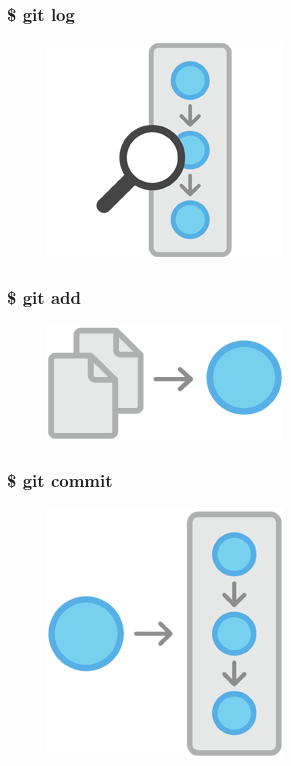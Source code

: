 \documentclass{beamer}
\begin{document}
\begin{frame}
    \frametitle{\$ git log}
    \begin{figure}[h!]
        \begin{center}
            \includegraphics[scale=0.8]{log.png}
        \end{center}
    \end{figure}
\end{frame}

\begin{frame}
    \frametitle{\$ git add}
    \begin{figure}[h!]
        \begin{center}
            \includegraphics[scale=0.8]{add.png}
        \end{center}
    \end{figure}
\end{frame}

\begin{frame}
    \frametitle{\$ git commit}
    \begin{figure}[h!]
        \begin{center}
            \includegraphics[scale=0.8]{commit.png}
        \end{center}
    \end{figure}
\end{frame}
\end{document}
